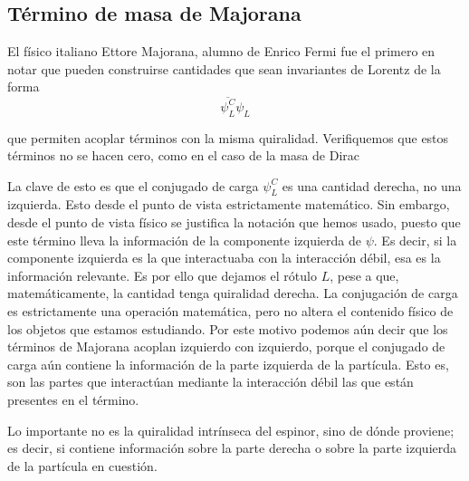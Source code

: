 \subsection{Término de masa de Majorana}

El físico italiano Ettore Majorana, alumno de Enrico Fermi fue el primero en notar que pueden construirse cantidades que sean invariantes de Lorentz de la forma
%
\begin{equation}
	\overline{\psi^C_L} \psi_L
\end{equation}

\noindent que permiten acoplar términos con la misma quiralidad. Verifiquemos que estos términos no se hacen cero, como en el caso de la masa de Dirac
%

La clave de esto es que el conjugado de carga $\psi^C_L$ es una cantidad derecha, no una izquierda. Esto desde el punto de vista estrictamente matemático. Sin embargo, desde el punto de vista físico se justifica la notación que hemos usado, puesto que este término lleva la información de la componente izquierda de $\psi$. Es decir, si la componente izquierda es la que interactuaba con la interacción débil, esa es la información relevante. Es por ello que dejamos el rótulo $L$, pese a que, matemáticamente, la cantidad tenga quiralidad derecha. La conjugación de carga es estrictamente una operación matemática, pero no altera el contenido físico de los objetos que estamos estudiando. Por este motivo podemos aún decir que los términos de Majorana acoplan izquierdo con izquierdo, porque el conjugado de carga aún contiene la información de la parte izquierda de la partícula. Esto es, son las partes que interactúan mediante la interacción débil las que están presentes en el término.

\begin{cabox}
	Lo importante no es la quiralidad intrínseca del espinor, sino de dónde proviene; es decir, si contiene información sobre la parte derecha o sobre la parte izquierda de la partícula en cuestión.
\end{cabox}


